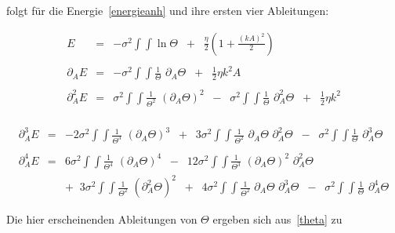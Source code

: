 \noindent folgt für die Energie~\eqref{energieanh} und ihre ersten vier Ableitungen:

\begin{small}
    \begin{eqnarray*}
        E &=& -\sigma^2 \int\!\!\!\int \ln \Theta\;\;+\;\;\frac{\eta}{2}\left(1+\frac{(kA)^2}{2}\right)\\
        &&\\
        \partial_A E &=& -\sigma^2 \int\!\!\!\int \frac{1}{\Theta}\,\, \partial_A\Theta\;\;+\;\;\frac{1}{2}\eta k^2A\\
        &&\\
        \partial_A^2 E &=& \sigma^2 \int\!\!\!\int \frac{1}{\Theta^2}\,\,\left(\partial_A\Theta\right)^2\;\;-\;\;\sigma^2\int\!\!\!\int\frac{1}{\Theta}\,\,\partial_A^2\Theta\;\;+\;\;\frac{1}{2}\eta k^2\\
    \end{eqnarray*}
\end{small}

\begin{small}
    \begin{eqnarray*}
        \partial_A^3 E &=& -2\sigma^2\int\!\!\!\int\frac{1}{\Theta^3}\,\,\left(\partial_A\Theta\right)^3\;\;+\;\;3\sigma^2\int\!\!\!\int\frac{1}{\Theta^2}\,\,\partial_A\Theta\,\,\partial_A^2\Theta\;\;-\;\;\sigma^2\int\!\!\!\int\frac{1}{\Theta}\,\,\partial_A^3\Theta\\
        &&\\
        \partial_A^4 E &=&6\sigma^2\int\!\!\!\int\frac{1}{\Theta^4}\,\,\left(\partial_A\Theta\right)^4\;\;-\;\;12\sigma^2\int\!\!\!\int\frac{1}{\Theta^3}\,\,\left(\partial_A\Theta\right)^2\,\,\partial_A^2\Theta\\
        &&+\;\;3\sigma^2\int\!\!\!\int\frac{1}{\Theta^2}\,\,\left(\partial_A^2\Theta\right)^2\;\;+\;\;4\sigma^2\int\!\!\!\int\frac{1}{\Theta^2}\,\,\partial_A\Theta\,\,\partial_A^3\Theta\;\;-\;\;\sigma^2\int\!\!\!\int\frac{1}{\Theta}\,\,\partial_A^4\Theta
    \end{eqnarray*}
\end{small}

\noindent Die hier erscheinenden Ableitungen von $\Theta$ ergeben sich
aus~\eqref{theta} zu

